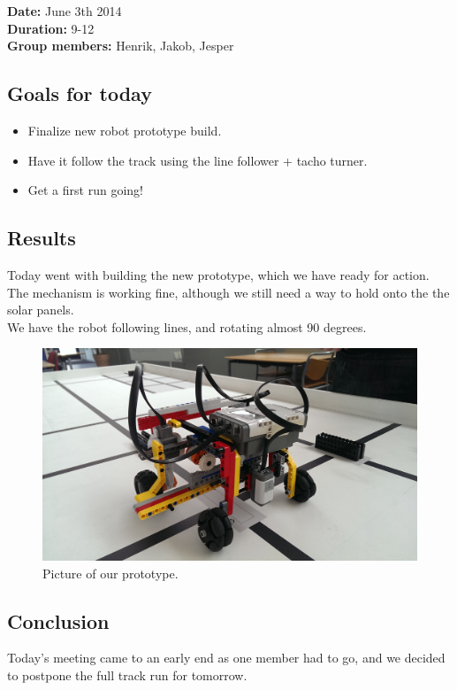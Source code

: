 \textbf{Date:} June 3th 2014\\\textbf{Duration:} 9-12\\\textbf{Group
members:} Henrik, Jakob, Jesper

\subsection{Goals for today}

\begin{itemize}
\itemsep1pt\parskip0pt
\item
  Finalize new robot prototype build.
\item
  Have it follow the track using the line follower + tacho turner.
\item
  Get a first run going!
\end{itemize}

\subsection{Results}

Today went with building the new prototype, which we have ready for
action. The mechanism is working fine, although we still need a way to
hold onto the the solar panels.\\We have the robot following lines, and
rotating almost 90 degrees.

\begin{figure}[hbt]
  \centering
  \includegraphics[scale=0.1]{../experiments/images/simplePrototype.jpg}
\caption{Picture of our prototype.}
\end{figure}

\subsection{Conclusion}
Today's meeting came to an early end as one member had to go, and we
decided to postpone the full track run for tomorrow.
